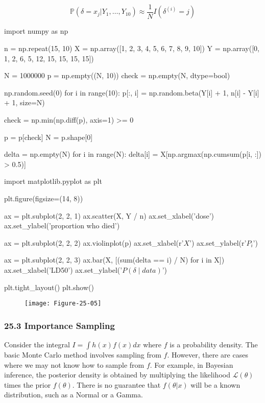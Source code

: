 \[ \mathbb{P}(\delta = x_j | Y_1, \dots, Y_10) \approx \frac{1}{N} I(\delta^{(i)} = j) \]

\begin{python}
import numpy as np

n = np.repeat(15, 10)
X = np.array([1, 2, 3, 4, 5, 6, 7, 8, 9, 10])
Y = np.array([0, 1, 2, 6, 5, 12, 15, 15, 15, 15])
\end{python}

\begin{python}
N = 1000000
p = np.empty((N, 10))
check = np.empty(N, dtype=bool)

np.random.seed(0)
for i in range(10):
    p[:, i] = np.random.beta(Y[i] + 1, n[i] - Y[i] + 1, size=N)
    
check = np.min(np.diff(p), axis=1) >= 0

p = p[check]
N = p.shape[0]

delta = np.empty(N)
for i in range(N):
    delta[i] = X[np.argmax(np.cumsum(p[i, :]) > 0.5)]
\end{python}

\begin{python}
import matplotlib.pyplot as plt

plt.figure(figsize=(14, 8))

ax = plt.subplot(2, 2, 1)
ax.scatter(X, Y / n)
ax.set_xlabel('dose')
ax.set_ylabel('proportion who died')

ax = plt.subplot(2, 2, 2)
ax.violinplot(p)
ax.set_xlabel(r'$X$')
ax.set_ylabel(r'$P_i$')

ax = plt.subplot(2, 2, 3)
ax.bar(X, [(sum(delta == i) / N) for i in X])
ax.set_xlabel('LD50')
ax.set_ylabel('$P(\delta \;|\; data)$')

plt.tight_layout()
plt.show()
\end{python}

\begin{figure}[H]
\texttt{[image: Figure-25-05]}
\end{figure}

\subsubsection{25.3 Importance Sampling}\label{importance-sampling}

Consider the integral \(I = \int h(x) f(x) dx\) where \(f\) is a
probability density. The basic Monte Carlo method involves sampling from
\(f\). However, there are cases where we may not know how to sample from
\(f\). For example, in Bayesian inference, the posterior density is
obtained by multiplying the likelihood \(\mathcal{L}(\theta)\) times the
prior \(f(\theta)\). There is no guarantee that \(f(\theta | x)\) will
be a known distribution, such as a Normal or a Gamma.

